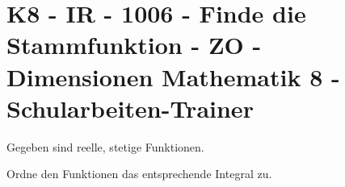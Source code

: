 \section{K8 - IR - 1006 - Finde die Stammfunktion - ZO - Dimensionen Mathematik 8 - Schularbeiten-Trainer}

\begin{beispiel}[K8 - IR]{1}
Gegeben sind reelle, stetige Funktionen.

Ordne den Funktionen das entsprechende Integral zu.

\end{beispiel}